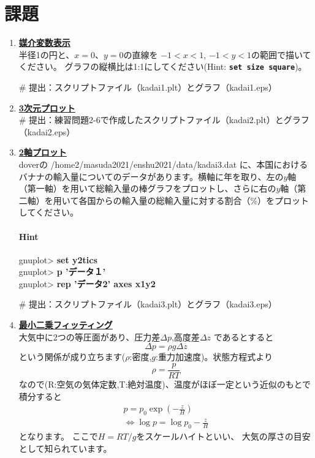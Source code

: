 \documentclass[a4j]{ujarticle} %
\newenvironment{terminal}{%
  \begin{center}
   \begin{minipage}{.8\textwidth}
    \setlength{\FrameSep}{.5\FrameSep}%
    \begin{framed}\ttfamily\small%
     \setlength\baselineskip{.85\baselineskip}%
}{%
    \end{framed}
   \end{minipage}
  \end{center}%
}
\begin{document}
\section{課題}
\begin{enumerate}
\item
\textbf{\underline{媒介変数表示}}\\
半径1の円と、$x=0$、$y=0$の直線を $-1<x<1$, $-1<y<1$の範囲で描いてください。
グラフの縦横比は1:1にしてください(Hint: {\tt\bf set size square})。

\# 提出：スクリプトファイル（kadai1.plt）とグラフ（kadai1.eps）

\item
\textbf{\underline{3次元プロット}}\\
\# 提出：練習問題2-6で作成したスクリプトファイル（kadai2.plt）とグラフ（kadai2.eps）

\item
\textbf{\underline{2軸プロット}}\\
doverの /home2/masuda2021/enshu2021/data/kadai3.dat に、本国におけるバナナの輸入量についてのデータがあります。横軸に年を取り、左の$y$軸（第一軸）を用いて総輸入量の棒グラフをプロットし、さらに右の$y$軸（第二軸）を用いて各国からの輸入量の総輸入量に対する割合（\%）をプロットしてください。

\paragraph{Hint}

\begin{terminal}
 gnuplot> {\bf set y2tics}\\
 gnuplot> {\bf p 'データ１'}\\
 gnuplot> {\bf rep 'データ2' axes x1y2}
\end{terminal}
     
\# 提出：スクリプトファイル（kadai3.plt）とグラフ（kadai3.eps）

\item
\textbf{\underline{最小二乗フィッティング}}\\
大気中に2つの等圧面があり、圧力差$\Delta p$,高度差$\Delta z$
であるとすると
\begin{equation}
 \Delta p = \rho g \Delta z \nonumber
\end{equation}
という関係が成り立ちます($\rho$:密度,$g$:重力加速度)。状態方程式より
\begin{equation}
 \rho = \frac{p}{RT} \nonumber
\end{equation}
なので(R:空気の気体定数,T:絶対温度)、温度がほぼ一定という近似のもとで積分すると
\begin{eqnarray}
 p=p_0 \exp{\left(-\frac{z}{H}\right)} \nonumber \\
 \Leftrightarrow \log{p}=\log{p_0}-\frac{z}{H} \nonumber
\end{eqnarray}
となります。
ここで$H=RT/g$をスケールハイトといい、
大気の厚さの目安として知られています。


\end{enumerate}
\end{document}
